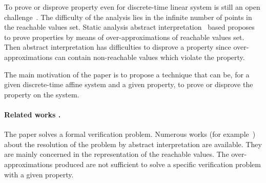 \documentclass[10pt]{article}
\begin{document}
To prove or disprove property even for discrete-time linear system is still an open challenge~\cite{acceleration-popl14,7403149,DBLP:conf/icalp/AlmagorCO018}.  The difficulty of the analysis lies in the infinite number of points in the reachable values set. Static analysis abstract interpretation~\cite{cousot2001abstract} based proposes to prove properties by means of over-approximations of reachable values set. Then abstract interpretation has difficulties to disprove a property since over-approximations can contain non-reachable values which violate the property.

The main motivation of the paper is to propose a technique that can be, for a given discrete-time affine system and a given property, to prove or disprove the property on the system. 


\paragraph{Related works .}
%
The paper solves a formal verification problem. Numerous works (for example~\cite{DBLP:journals/corr/abs-1111-5223,gonnord2014abstract,mine-ESOP16,Sankaranarayanan_BenSassi__2017__Template}) about the resolution of the problem by abstract interpretation are available. They are mainly concerned in the representation of the reachable values. The over-approximations produced are not sufficient to solve a specific verification problem with a given property.
\end{document}
